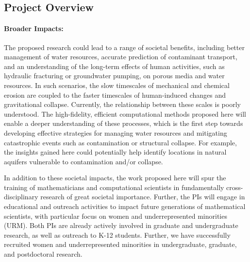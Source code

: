 \documentclass[11pt]{article}
\begin{document}
\subsection{Project Overview}

\paragraph{Broader Impacts:} The proposed research could lead to a range of societal benefits, including better management of water resources, accurate prediction of contaminant transport, and an understanding of the long-term effects of human activities, such as hydraulic fracturing or groundwater pumping, on porous media and water resources. In such scenarios, the slow timescales of mechanical and chemical erosion are coupled to the faster timescales of human-induced changes and gravitational collapse. Currently, the relationship between these scales is poorly understood. The high-fidelity, efficient computational methods proposed here will enable a deeper understanding of these processes, which is the first step towards developing effective strategies for managing water resources and mitigating catastrophic events such as contamination or structural collapse. For example, the insights gained here could potentially help identify locations in natural aquifers vulnerable to contamination and/or collapse.  

In addition to these societal impacts, the work proposed here will spur the training of mathematicians and computational scientists in fundamentally cross-disciplinary research of great societal importance. Further, the PIs will engage in educational and outreach activities to impact future generations of mathematical scientists, with particular focus on women and underrepresented minorities (URM). Both PIs are already actively involved in graduate and undergraduate research, as well as outreach to K-12 students. Further, we have successfully recruited women and underrepresented minorities in undergraduate, graduate, and postdoctoral research.  
\end{document}
